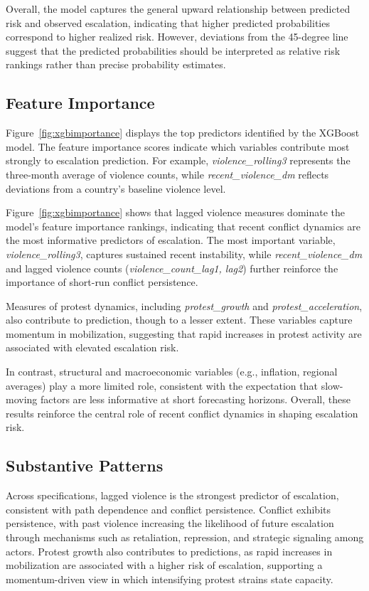 \documentclass[12pt]{article}
\begin{document}
Overall, the model captures the general upward relationship between predicted risk and observed escalation, indicating that higher predicted probabilities correspond to higher realized risk. However, deviations from the 45-degree line suggest that the predicted probabilities should be interpreted as relative risk rankings rather than precise probability estimates.

\subsection{Feature Importance}
\label{sec:feature_imp}
Figure~\ref{fig:xgbimportance} displays the top predictors identified by the
XGBoost model. The feature importance scores indicate which variables
contribute most strongly to escalation prediction. For example, \textit{violence\_rolling3} represents the three-month average of violence counts, while \textit{recent\_violence\_dm} reflects deviations from a country’s baseline violence level.

Figure~\ref{fig:xgbimportance} shows that lagged violence measures dominate the model’s feature importance rankings, indicating that recent conflict dynamics are the most informative predictors of escalation. The most important variable, \textit{violence\_rolling3}, captures sustained recent instability, while \textit{recent\_violence\_dm} and lagged violence counts (\textit{violence\_count\_lag1, lag2}) further reinforce the importance of short-run conflict persistence.

Measures of protest dynamics, including \textit{protest\_growth} and \textit{protest\_acceleration}, also contribute to prediction, though to a lesser extent. These variables capture momentum in mobilization, suggesting that rapid increases in protest activity are associated with elevated escalation risk.

In contrast, structural and macroeconomic variables (e.g., inflation, regional averages) play a more limited role, consistent with the expectation that slow-moving factors are less informative at short forecasting horizons. Overall, these results reinforce the central role of recent conflict dynamics in shaping escalation risk.

\subsection{Substantive Patterns}
\label{sub_pat}

Across specifications, lagged violence is the strongest predictor of escalation, consistent with path dependence and conflict persistence. Conflict exhibits persistence, with past violence increasing the likelihood of future escalation through mechanisms such as retaliation, repression, and strategic signaling among actors. Protest growth also contributes to predictions, as rapid increases in mobilization are associated with a higher risk of escalation, supporting a momentum-driven view in which intensifying protest strains state capacity.
\end{document}
